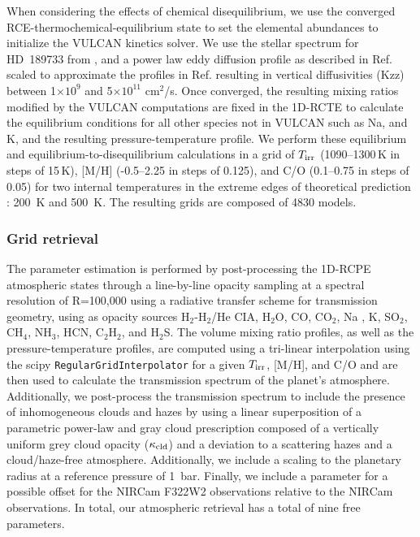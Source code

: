 \documentclass[sn-standardnature]{sn-jnl}%
\begin{document}
When considering the effects of chemical disequilibrium, we use the converged RCE-thermochemical-equilibrium state to set the elemental abundances to initialize the VULCAN kinetics solver. We use the stellar spectrum for HD~189733 from , and a power law eddy diffusion profile as described in Ref.  scaled to approximate the profiles in Ref.  resulting in vertical diffusivities (Kzz) between 1$\times 10^{9}$ and 5$\times 10^{11}$ cm$^2$/s. Once converged, the resulting mixing ratios modified by the VULCAN computations are fixed in the 1D-RCTE to calculate the equilibrium conditions for all other species not in VULCAN such as Na, and K, and the resulting pressure-temperature profile. We perform these equilibrium and equilibrium-to-disequilibrium calculations in a grid of $T_{\rm irr}$ (1090--1300\,K in steps of 15\,K), [M/H] (-0.5--2.25 in steps of 0.125), and C/O (0.1--0.75 in steps of 0.05) for two internal temperatures in the extreme edges of theoretical prediction : 200~K and 500~K. The resulting grids are composed of 4830 models.






\subsubsection*{Grid retrieval}

The parameter estimation is performed by post-processing the 1D-RCPE atmospheric states through a line-by-line opacity sampling at a spectral resolution of R=100,000 using a radiative transfer scheme for transmission geometry, using as opacity sources H$_2$-H$_2$/He CIA, H$_2$O, CO, CO$_2$, Na , K, SO$_2$,  CH$_4$, NH$_3$, HCN, C$_2$H$_2$, and H$_2$S. The volume mixing ratio profiles, as well as the pressure-temperature profiles, are computed using a tri-linear interpolation using the scipy  {\tt RegularGridInterpolator} for a given  $T_{\rm irr}$, [M/H], and C/O and are then used to calculate the transmission spectrum of the planet's atmosphere. Additionally, we post-process the transmission spectrum to include the presence of inhomogeneous clouds and hazes  by using a linear superposition of a parametric power-law and gray cloud prescription composed of a vertically uniform grey cloud opacity ($\kappa_{\rm cld}$) and a deviation to a scattering hazes  and a cloud/haze-free atmosphere. Additionally, we include a scaling to the planetary radius at a reference pressure of 1~bar. Finally, we include a parameter for a possible offset for the NIRCam F322W2 observations relative to the NIRCam observations. In total, our atmospheric retrieval has a total of nine free parameters.
\end{document}
